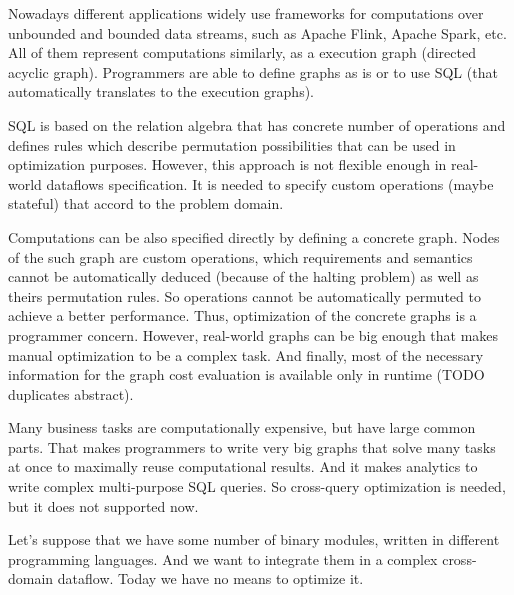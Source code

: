 Nowadays different applications widely use frameworks for computations over unbounded and bounded data streams, such as Apache Flink, Apache Spark, etc.
All of them represent computations similarly, as a execution graph (directed acyclic graph).
Programmers are able to define graphs as is or to use SQL (that automatically translates to the execution graphs).

SQL is based on the relation algebra that has concrete number of operations and defines rules which describe permutation possibilities that can be used in optimization purposes.
However, this approach is not flexible enough in real-world dataflows specification.
It is needed to specify custom operations (maybe stateful) that accord to the problem domain.

Computations can be also specified directly by defining a concrete graph.
Nodes of the such graph are custom operations, which requirements and semantics cannot be automatically deduced (because of the halting problem) as well as theirs permutation rules.
So operations cannot be automatically permuted to achieve a better performance.
Thus, optimization of the concrete graphs is a programmer concern.
However, real-world graphs can be big enough that makes manual optimization to be a complex task.
And finally, most of the necessary information for the graph cost evaluation is available only in runtime (TODO duplicates abstract).

Many business tasks are computationally expensive, but have large common parts.
That makes programmers to write very big graphs that solve many tasks at once to maximally reuse computational results.
And it makes analytics to write complex multi-purpose SQL queries.
So cross-query optimization is needed, but it does not supported now.

Let's suppose that we have some number of binary modules, written in different programming languages.
And we want to integrate them in a complex cross-domain dataflow.
Today we have no means to optimize it.

